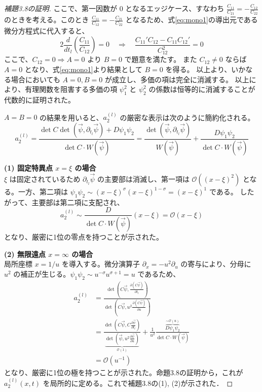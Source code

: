 \begin{story}
\begin{proof}[補題3.8の証明]
ここで、第一因数が $0$ となるエッジケース、すなわち $\frac{C_{11}}{C_{21}} = - \frac{C_{12}}{C_{22}}$ のときを考える。このとき $\frac{C_{11}}{C_{12}} = -\frac{C_{21}}{C_{22}}$ となるため、式\eqref{eq:mono1}の導出元である微分方程式に代入すると、
\begin{equation*}
    2 \frac{d}{dt_l}\left(\frac{C_{11}}{C_{12}}\right) = 0 \quad \Longrightarrow \quad \frac{C_{11}'C_{12} - C_{11}C_{12}'}{C_{12}^2} = 0
\end{equation*}
ここで、$C_{12} = 0 \Rightarrow A=0$ より $B=0$ で題意を満たす。
また $C_{12} \neq 0$ ならば $A=0$ となり、式\eqref{eq:mono1}より結果として $B=0$ を得る。
以上より、いかなる場合においても $A=0, B=0$ が成立し、多価の項は完全に消滅する。
以上により、有理関数を阻害する多価の項 $\psi_1^2$ と $\psi_2^2$ の係数は恒等的に消滅することが代数的に証明された。

$A=B=0$ の結果を用いると、$a_2^{(l)}$ の厳密な表示は次のように簡約化される。
\begin{equation}
    a_2^{(l)} = \frac{\det C \det(\vec{\psi}, \partial_{t_l}\vec{\psi}) + D\psi_1\psi_2}{\det C \cdot W(\vec{\psi})} = \frac{\det(\vec{\psi}, \partial_{t_l}\vec{\psi})}{W(\vec{\psi})} + \frac{D\psi_1\psi_2}{\det C \cdot W(\vec{\psi})}
\end{equation}

\textbf{(1) 固定特異点 $x=\xi$ の場合} \\
$\xi$ は固定されているため $\partial_{t_l}\vec{\psi}$ の主要部は消滅し、第一項は $\mathcal{O}((x-\xi)^2)$ となる。一方、第二項は $\psi_1\psi_2 \sim (x-\xi)^\sigma (x-\xi)^{1-\sigma} = (x-\xi)^1$ である。
したがって、主要部は第二項に支配され、
\begin{equation}
    a_2^{(l)} \sim \frac{D}{\det C \cdot W(\vec{\psi})} (x-\xi) = \mathcal{O}(x-\xi)
\end{equation}
となり、厳密に1位の零点を持つことが示された。

\textbf{(2) 無限遠点 $x=\infty$ の場合} \\
局所座標 $x=1/u$ を導入する。微分演算子 $\partial_x = -u^2 \partial_u$ の寄与により、分母に $u^2$ の補正が生じる。$\psi_1\psi_2 \sim u^{-\sigma} u^{\sigma+1} = u$ であるため、
\begin{align*}
    a_2^{(l)} &= \frac{\det\left(C\vec{\psi}, \frac{\partial (C\vec{\psi})}{\partial t_l}\right)}{\det\left(C\vec{\psi}, u^2 \frac{\partial (C\vec{\psi})}{\partial u}\right)} \\[8pt]
    &= \frac{\det\left(C\vec{\psi}, C\frac{\partial \vec{\psi}}{\partial t_l}\right)}{\underbrace{\det\left(\vec{\psi}, u^2 \frac{\partial \vec{\psi}}{\partial u}\right)}_{\mathcal{O}(1)}} + \frac{1}{u^2} \frac{\overbrace{D\psi_1\psi_2}^{\sim \mathcal{O}(u)}}{\det C \cdot W(\vec{\psi})} \\[8pt]
    &= \mathcal{O}(u^{-1})
\end{align*}
となり、厳密に1位の極を持つことが示された。命題3.8の証明から，これが $a_2^{(l)}(x,t)$ を局所的に定める。これで補題3.8の(1), (2)が示された．


\end{proof}
\end{story}
